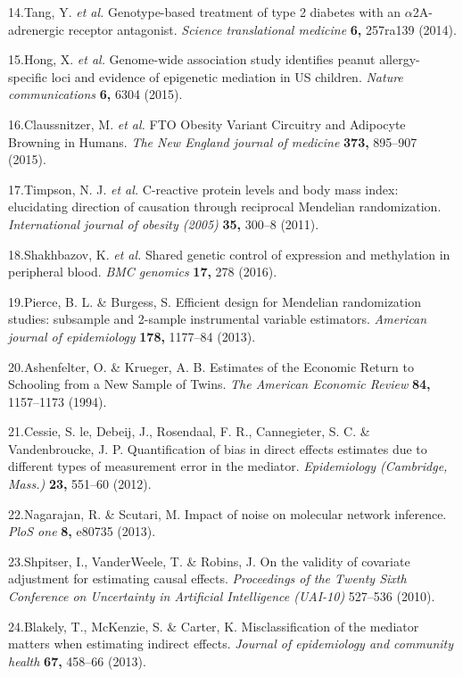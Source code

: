 \documentclass[]{article}
\begin{document}
14.Tang, Y. \emph{et al.} Genotype-based treatment of type 2 diabetes
with an \(\alpha\)2A-adrenergic receptor antagonist. \emph{Science
translational medicine} \textbf{6,} 257ra139 (2014).

15.Hong, X. \emph{et al.} Genome-wide association study identifies
peanut allergy-specific loci and evidence of epigenetic mediation in US
children. \emph{Nature communications} \textbf{6,} 6304 (2015).

16.Claussnitzer, M. \emph{et al.} FTO Obesity Variant Circuitry and
Adipocyte Browning in Humans. \emph{The New England journal of medicine}
\textbf{373,} 895--907 (2015).

17.Timpson, N. J. \emph{et al.} C-reactive protein levels and body mass
index: elucidating direction of causation through reciprocal Mendelian
randomization. \emph{International journal of obesity (2005)}
\textbf{35,} 300--8 (2011).

18.Shakhbazov, K. \emph{et al.} Shared genetic control of expression and
methylation in peripheral blood. \emph{BMC genomics} \textbf{17,} 278
(2016).

19.Pierce, B. L. \& Burgess, S. Efficient design for Mendelian
randomization studies: subsample and 2-sample instrumental variable
estimators. \emph{American journal of epidemiology} \textbf{178,}
1177--84 (2013).

20.Ashenfelter, O. \& Krueger, A. B. Estimates of the Economic Return to
Schooling from a New Sample of Twins. \emph{The American Economic
Review} \textbf{84,} 1157--1173 (1994).

21.Cessie, S. le, Debeij, J., Rosendaal, F. R., Cannegieter, S. C. \&
Vandenbroucke, J. P. Quantification of bias in direct effects estimates
due to different types of measurement error in the mediator.
\emph{Epidemiology (Cambridge, Mass.)} \textbf{23,} 551--60 (2012).

22.Nagarajan, R. \& Scutari, M. Impact of noise on molecular network
inference. \emph{PloS one} \textbf{8,} e80735 (2013).

23.Shpitser, I., VanderWeele, T. \& Robins, J. On the validity of
covariate adjustment for estimating causal effects. \emph{Proceedings of
the Twenty Sixth Conference on Uncertainty in Artificial Intelligence
(UAI-10)} 527--536 (2010).

24.Blakely, T., McKenzie, S. \& Carter, K. Misclassification of the
mediator matters when estimating indirect effects. \emph{Journal of
epidemiology and community health} \textbf{67,} 458--66 (2013).
\end{document}
